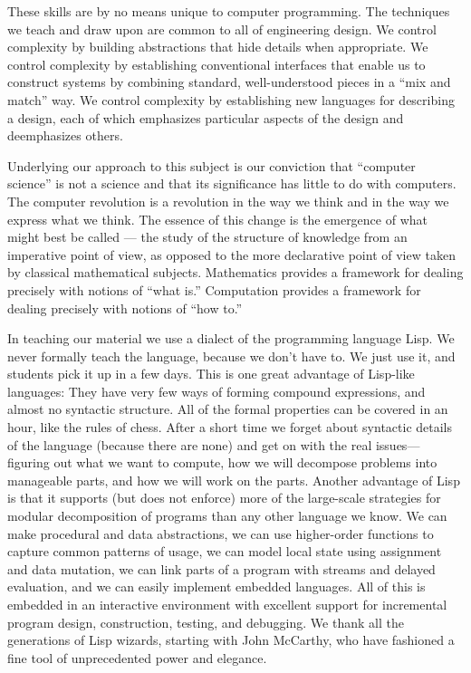 These skills are by no means unique to computer programming.
The techniques we teach and draw upon are common to all of engineering design.
We control complexity by building abstractions that hide details when appropriate.
We control complexity by establishing conventional interfaces that enable us to construct systems by combining standard, well-understood pieces in a “mix and match” way.
We control complexity by establishing new languages for describing a design, each of which emphasizes particular aspects of the design and deemphasizes others.

Underlying our approach to this subject is our conviction that “computer science” is not a science and that its significance has little to do with computers.
The computer revolution is a revolution in the way we think and in the way we express what we think.
The essence of this change is the emergence of what might best be called ---%
the study of the structure of knowledge from an imperative point of view, as opposed to the
more declarative point of view taken by classical mathematical subjects.
Mathematics provides a framework for dealing precisely with notions of “what is.”
Computation provides a framework for dealing precisely with notions of “how to.”

In teaching our material we use a dialect of the programming language Lisp.
We never formally teach the language, because we don’t have to.
We just use it, and students pick it up in a few days.
This is one great advantage of Lisp-like languages:
They have very few ways of forming compound expressions, and almost no syntactic structure.
All of the formal properties can be covered in an hour, like the rules of chess.
After a short time we forget about syntactic details of the language (because there are none) and get on with the real issues---%
figuring out what we want to compute, how we will decompose problems into manageable parts, and how we will work on the parts.
Another advantage of Lisp is that it supports (but does not enforce) more of the large-scale strategies for modular decomposition of programs than any other language we know.
We can make procedural and data abstractions, we can use higher-order functions to capture common patterns of usage, we can model local state using assignment and data mutation, we can link parts of a program with streams and delayed evaluation, and we can easily implement embedded languages.
All of this is embedded in an interactive environment with excellent support for incremental program design, construction, testing, and debugging.
We thank all the generations of Lisp wizards, starting with John McCarthy, who have fashioned a fine tool of unprecedented power and elegance.

